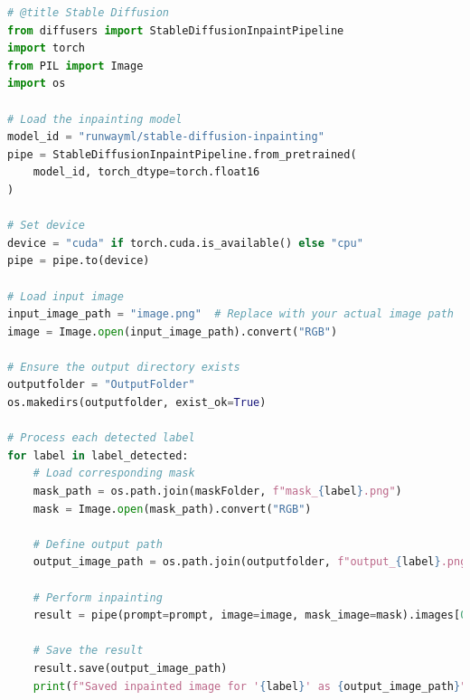 \documentclass[11pt,letterpaper]{article}
\begin{document}
\begin{lstlisting}[language=Python, caption={Code for Noun extraction}, label={lst:mask_processing}]
# @title Stable Diffusion
from diffusers import StableDiffusionInpaintPipeline
import torch
from PIL import Image
import os

# Load the inpainting model
model_id = "runwayml/stable-diffusion-inpainting"
pipe = StableDiffusionInpaintPipeline.from_pretrained(
    model_id, torch_dtype=torch.float16
)

# Set device
device = "cuda" if torch.cuda.is_available() else "cpu"
pipe = pipe.to(device)

# Load input image
input_image_path = "image.png"  # Replace with your actual image path
image = Image.open(input_image_path).convert("RGB")

# Ensure the output directory exists
outputfolder = "OutputFolder"
os.makedirs(outputfolder, exist_ok=True)

# Process each detected label
for label in label_detected:
    # Load corresponding mask
    mask_path = os.path.join(maskFolder, f"mask_{label}.png")
    mask = Image.open(mask_path).convert("RGB")
    
    # Define output path
    output_image_path = os.path.join(outputfolder, f"output_{label}.png")
    
    # Perform inpainting
    result = pipe(prompt=prompt, image=image, mask_image=mask).images[0]
    
    # Save the result
    result.save(output_image_path)
    print(f"Saved inpainted image for '{label}' as {output_image_path}")
\end{lstlisting}
\end{document}
